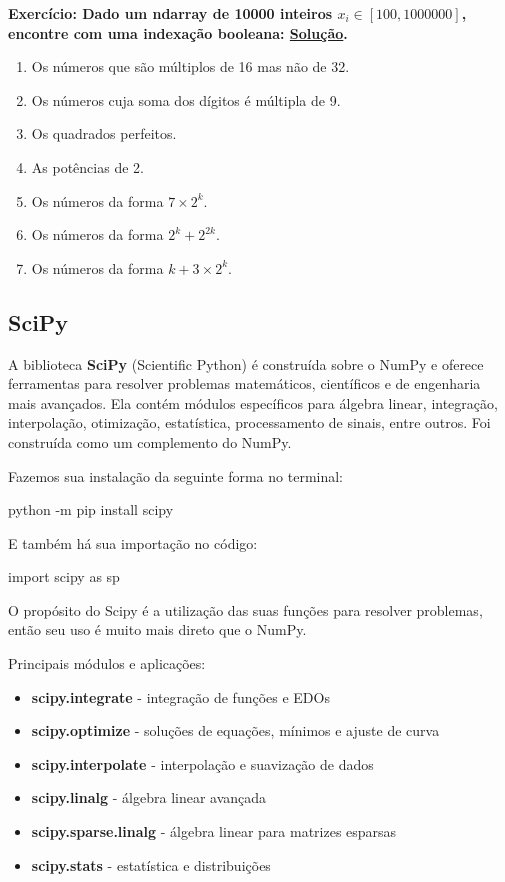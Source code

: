 \documentclass[11pt, a4paper]{article}
\begin{document}
\label{ex4.1.a}
\textbf{Exercício: Dado um ndarray de 10000 inteiros \(x_i \in [100,1000000]\), encontre com uma indexação booleana: \hyperref[sol_ex4.1.a]{Solução}.}
\begin{enumerate}
    \item Os números que são múltiplos de 16 mas não de 32.
    \item Os números cuja soma dos dígitos é múltipla de 9.
    \item Os quadrados perfeitos.
    \item As potências de 2.
    \item Os números da forma \(7\times 2^k\).
    \item Os números da forma \(2^k+2^{2k}\).
    \item Os números da forma \(k+3\times 2^{k}\).
\end{enumerate}

\subsection{SciPy}

A biblioteca \textbf{SciPy} (Scientific Python) é construída sobre o NumPy e oferece ferramentas para resolver problemas matemáticos, científicos e de engenharia mais avançados. Ela contém módulos específicos para álgebra linear, integração, interpolação, otimização, estatística, processamento de sinais, entre outros. Foi construída como um complemento do NumPy.

Fazemos sua instalação da seguinte forma no terminal:
\begin{code}
python -m pip install scipy
\end{code}

E também há sua importação no código:
\begin{code}
import scipy as sp
\end{code}

O propósito do Scipy é a utilização das suas funções para resolver problemas, então seu uso é muito mais direto que o NumPy.

Principais módulos e aplicações:
\begin{itemize}
    \item \textbf{scipy.integrate} - integração de funções e EDOs
    \item \textbf{scipy.optimize} - soluções de equações, mínimos e ajuste de curva
    \item \textbf{scipy.interpolate} - interpolação e suavização de dados
    \item \textbf{scipy.linalg} - álgebra linear avançada
    \item \textbf{scipy.sparse.linalg} - álgebra linear para matrizes esparsas
    \item \textbf{scipy.stats} - estatística e distribuições
\end{itemize}
\end{document}
